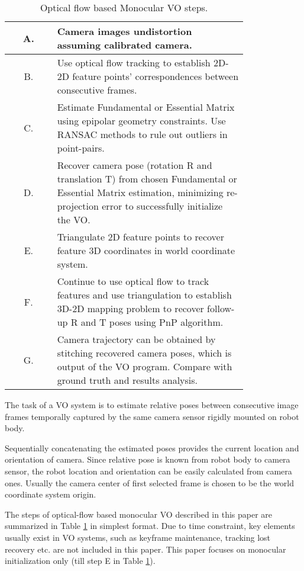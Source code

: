 \documentclass[10pt,twocolumn,letterpaper]{article}
\begin{document}
\begin{table}[t]
\begin{center}
\begin{tabular}{ |c|p{0.8\linewidth}| }
 \hline
 A. & Camera images undistortion assuming calibrated camera. \\ 
 \hline
 B. & Use optical flow tracking to establish 2D-2D feature points’ correspondences between consecutive frames. \\ 
 \hline
 C. & Estimate Fundamental or Essential Matrix using epipolar geometry constraints. Use RANSAC \cite{Fischler:1981:RSC:358669.358692} methods to rule out outliers in point-pairs.\\ 
 \hline
 D. & Recover camera pose (rotation R and translation T) from chosen Fundamental or Essential Matrix estimation, minimizing re-projection error to successfully initialize the VO. \\ 
 \hline
 E. & Triangulate 2D feature points to recover feature 3D coordinates in world coordinate system. \\ 
 \hline
 F. & Continue to use optical flow to track features and use triangulation to establish 3D-2D mapping problem to recover follow-up R and T poses using PnP algorithm. \\ 
 \hline
 G. & Camera trajectory can be obtained by stitching recovered camera poses, which is output of the VO program. Compare with ground truth and results analysis. \\
 \hline
\end{tabular}
\end{center}
\caption{Optical flow based Monocular VO steps.}
\label{table:1}
\end{table}

The task of a VO system is to estimate relative poses between consecutive image frames temporally captured by the same camera sensor rigidly mounted on robot body. 

Sequentially concatenating the estimated poses provides the current location and orientation of camera. Since relative pose is known from robot body to camera sensor, the robot location and orientation can be easily calculated from camera ones. Usually the camera center of first selected frame is chosen to be the world coordinate system origin. 

The steps of optical-flow based monocular VO described in this paper are summarized in Table \ref{table:1} in simplest format. Due to time constraint, key elements usually exist in VO systems, such as keyframe maintenance, tracking lost recovery etc. are not included in this paper. This paper focuses on monocular initialization only (till step E in Table \ref{table:1}).
\end{document}

